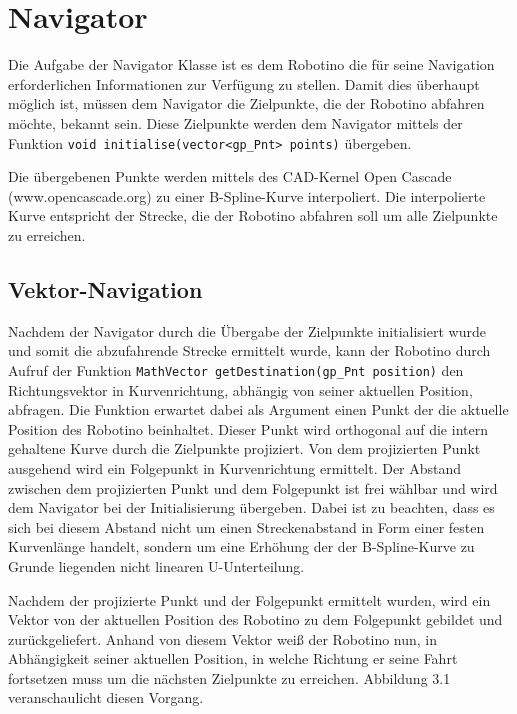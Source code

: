\chapter{Navigator}

Die Aufgabe der Navigator Klasse ist es dem Robotino die für seine Navigation
erforderlichen Informationen zur Verfügung zu stellen. Damit dies überhaupt
möglich ist, müssen dem Navigator die Zielpunkte, die der Robotino abfahren
möchte, bekannt sein. Diese Zielpunkte werden dem Navigator mittels der Funktion
\verb|void initialise(vector<gp_Pnt> points)| übergeben.

Die übergebenen Punkte werden mittels des CAD-Kernel Open Cascade
(www.opencascade.org) zu einer B-Spline-Kurve interpoliert. Die interpolierte
Kurve entspricht der Strecke, die der Robotino abfahren soll um alle Zielpunkte
zu erreichen.


\section{Vektor-Navigation}

Nachdem der Navigator durch die Übergabe der Zielpunkte initialisiert wurde und
somit die abzufahrende Strecke ermittelt wurde, kann der Robotino durch Aufruf
der Funktion \verb|MathVector getDestination(gp_Pnt position)| den
Richtungsvektor in Kurvenrichtung, abhängig von seiner aktuellen Position,
abfragen. Die Funktion erwartet dabei als Argument einen Punkt der die aktuelle
Position des Robotino beinhaltet. Dieser Punkt wird orthogonal auf die intern
gehaltene Kurve durch die Zielpunkte projiziert. Von dem projizierten Punkt
ausgehend wird ein Folgepunkt in Kurvenrichtung ermittelt. Der Abstand zwischen
dem projizierten Punkt und dem Folgepunkt ist frei wählbar und wird dem Navigator
bei der Initialisierung übergeben. Dabei ist zu beachten, dass es sich bei
diesem Abstand nicht um einen Streckenabstand in Form einer festen Kurvenlänge
handelt, sondern um eine Erhöhung der der B-Spline-Kurve zu Grunde liegenden
nicht linearen U-Unterteilung.

Nachdem der projizierte Punkt und der Folgepunkt ermittelt wurden, wird ein
Vektor von der aktuellen Position des Robotino zu dem Folgepunkt gebildet und
zurückgeliefert. Anhand von diesem Vektor weiß der Robotino nun, in Abhängigkeit
seiner aktuellen Position, in welche Richtung er seine Fahrt fortsetzen muss um
die nächsten Zielpunkte zu erreichen. Abbildung 3.1 veranschaulicht diesen
Vorgang.



